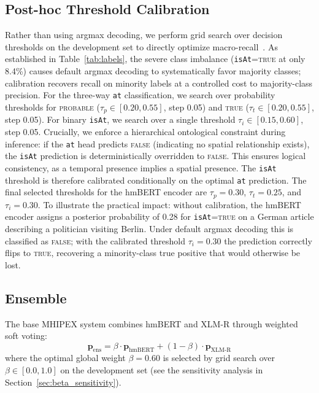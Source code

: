 \documentclass[11pt,a4paper]{article}
\begin{document}
\subsection{Post-hoc Threshold Calibration}
\label{sec:calibration}

Rather than using argmax decoding, we perform grid search over decision thresholds on the development set to directly optimize macro-recall~\cite{guo2017,lipton2014}. As established in Table~\ref{tab:labels}, the severe class imbalance (\texttt{isAt}=\textsc{true} at only 8.4\%) causes default argmax decoding to systematically favor majority classes; calibration recovers recall on minority labels at a controlled cost to majority-class precision. For the three-way \texttt{at} classification, we search over probability thresholds for \textsc{probable} ($\tau_p \in [0.20, 0.55]$, step 0.05) and \textsc{true} ($\tau_t \in [0.20, 0.55]$, step 0.05). For binary \texttt{isAt}, we search over a single threshold $\tau_i \in [0.15, 0.60]$, step 0.05. Crucially, we enforce a hierarchical ontological constraint during inference: if the \texttt{at} head predicts \textsc{false} (indicating no spatial relationship exists), the \texttt{isAt} prediction is deterministically overridden to \textsc{false}. This ensures logical consistency, as a temporal presence implies a spatial presence. The \texttt{isAt} threshold is therefore calibrated conditionally on the optimal \texttt{at} prediction. The final selected thresholds for the hmBERT encoder are $\tau_p=0.30$, $\tau_t=0.25$, and $\tau_i=0.30$. To illustrate the practical impact: without calibration, the hmBERT encoder assigns a posterior probability of 0.28 for \texttt{isAt}=\textsc{true} on a German article describing a politician visiting Berlin. Under default argmax decoding this is classified as \textsc{false}; with the calibrated threshold $\tau_i=0.30$ the prediction correctly flips to \textsc{true}, recovering a minority-class true positive that would otherwise be lost.

\subsection{Ensemble}
\label{sec:ensemble}

The base MHIPEX system combines hmBERT and XLM-R through weighted soft voting:
\begin{equation}
    \mathbf{p}_{\text{ens}} = \beta \cdot \mathbf{p}_{\text{hmBERT}} + (1-\beta) \cdot \mathbf{p}_{\text{XLM-R}}
\end{equation}
where the optimal global weight $\beta=0.60$ is selected by grid search over $\beta \in [0.0, 1.0]$ on the development set (see the sensitivity analysis in Section~\ref{sec:beta_sensitivity}).
\end{document}
